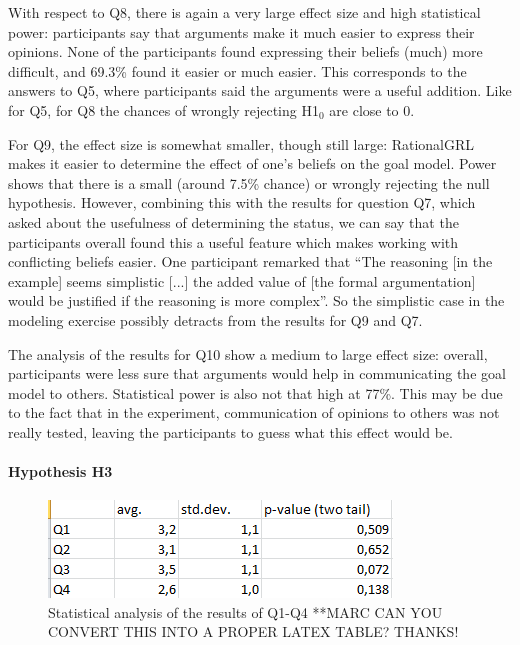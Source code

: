 With respect to Q8, there is again a very large effect size and high statistical power: participants say that arguments make it much easier to express their opinions. None of the participants found expressing their beliefs (much) more difficult, and 69.3\% found it easier or much easier. This corresponds to the answers to Q5, where participants said the arguments were a useful addition. Like for Q5, for Q8 the chances of wrongly rejecting H1$_{0}$ are close to 0. 

For Q9, the effect size is somewhat smaller, though still large: RationalGRL makes it easier to determine the effect of one's beliefs on the goal model. Power shows that there is a small (around 7.5\% chance) or wrongly rejecting the null hypothesis. However, combining this with the results for question Q7, which asked about the usefulness of determining the status, we can say that the participants overall found this a useful feature which makes working with conflicting beliefs easier. One participant remarked that ``The reasoning [in the example] seems simplistic [...] the added value of [the formal argumentation] would be justified if the reasoning is more complex''. So the simplistic case in the modeling exercise possibly detracts from the results for Q9 and Q7.

The analysis of the results for Q10 show a medium to large effect size: overall, participants were less sure that arguments would help in communicating the goal model to others. Statistical power is also not that high at 77\%. This may be due to the fact that in the experiment, communication of opinions to others was not really tested, leaving the participants to guess what this effect would be.  

\paragraph{Hypothesis H3}
\begin{figure}[t]
\centering
\includegraphics[width=\textwidth]{img/Table_analysisQ1-Q4.png}
\caption{Statistical analysis of the results of Q1-Q4 **MARC CAN YOU CONVERT THIS INTO A PROPER LATEX TABLE? THANKS!}
\label{fig:statsanalysis2}
\end{figure}

